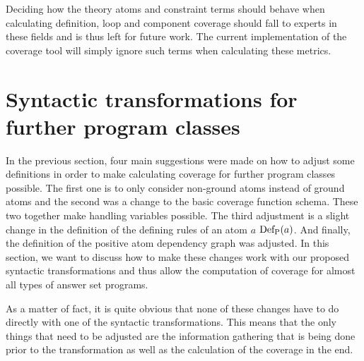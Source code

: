 Deciding how the theory atoms and constraint terms should behave when calculating definition, loop and component coverage should fall to experts in these fields and is thus left for future work. The current implementation of the coverage tool will simply ignore such terms when calculating these metrics.

\begin{comment}
- explain how variable influence everything + how i chose to handle them (different approaches might be possible!)
 -> maximal coverage can not be computed as this requires listing of all possible inputs! (might be infinitely many with variables) -> basic coverage function schema has to be changed! (non infinite domain for variables could fix this?)

- show table with all the constructs that exist in asp (maybe short explanation of each or just point to the guide)

- go over each construct and explain how they should/might work with each coverage metric and how variables influence this or not
\end{comment}

\section{Syntactic transformations for further program classes}
\label{sec:Coverage for further program classes/Syntactic transformations for further program classes}
In the previous section, four main suggestions were made on how to adjust some definitions in order to make calculating coverage for further program classes possible. The first one is to only consider non-ground atoms instead of ground atoms and the second was a change to the basic coverage function schema. These two together make handling variables possible. The third adjustment is a slight change in the definition of the defining rules of an atom $a$ \(\operatorname{Def_P}(a)\). And finally, the definition of the positive atom dependency graph was adjusted. In this section, we want to discuss how to make these changes work with our proposed syntactic transformations and thus allow the computation of coverage for almost all types of answer set programs.

As a matter of fact, it is quite obvious that none of these changes have to do directly with one of the syntactic transformations. This means that the only things that need to be adjusted are the information gathering that is being done prior to the transformation as well as the calculation of the coverage in the end.

